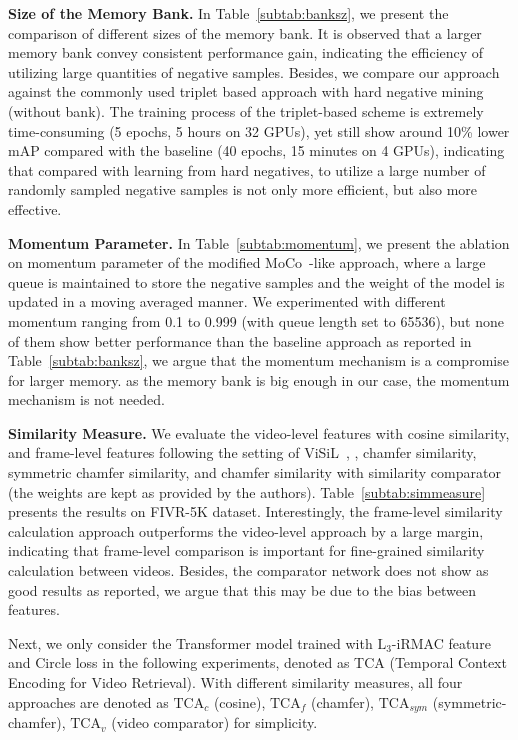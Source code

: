 \documentclass[10pt,twocolumn,letterpaper]{article}
\begin{document}
\textbf{Size of the Memory Bank.}
In Table~\ref{subtab:banksz}, we present the comparison of different sizes of the memory bank. It is observed that a larger memory bank convey consistent performance gain, indicating the efficiency of utilizing large quantities of negative samples.
Besides, we compare our approach against the commonly used triplet based approach with hard negative mining~\cite{kordopatis2017dml} (without bank). The training process of the triplet-based scheme is extremely time-consuming (5 epochs, 5 hours on 32 GPUs), yet still show around 10\% lower mAP compared with the baseline (40 epochs, 15 minutes on 4 GPUs), indicating that compared with learning from hard negatives, to utilize a large number of randomly sampled negative samples is not only more efficient, but also more effective. 

\textbf{Momentum Parameter.}
In Table~\ref{subtab:momentum}, we present the ablation on momentum parameter of the modified MoCo~\cite{he2019momentum}-like approach, where a large queue is maintained to store the negative samples and the weight of the model is updated in a moving averaged manner.
We experimented with different momentum ranging from 0.1 to 0.999 (with queue length set to 65536), but none of them show better performance than the baseline approach as reported in Table~\ref{subtab:banksz}, we argue that the momentum mechanism is a compromise for larger memory. as the memory bank is big enough in our case, the momentum mechanism is not needed. 

\textbf{Similarity Measure.}
We evaluate the video-level features with cosine similarity, and frame-level features following the setting of ViSiL~\cite{kordopatis2019visil}, \ie, chamfer similarity, symmetric chamfer similarity, and chamfer similarity with similarity comparator (the weights are kept as provided by the authors). Table~\ref{subtab:simmeasure} presents the results on FIVR-5K dataset. Interestingly, the frame-level similarity calculation approach outperforms the video-level approach by a large margin, indicating that frame-level comparison is important for fine-grained similarity calculation between videos. Besides, the comparator network does not show as good results as reported, we argue that this may be due to the bias between features.


Next, we only consider the Transformer model trained with $\text{L}_3$-iRMAC feature and Circle loss in the following experiments, denoted as TCA (Temporal Context Encoding for Video Retrieval). With different similarity measures, all four approaches are denoted as $\text{TCA}_{c}$ (cosine), $\text{TCA}_{f}$ (chamfer), $\text{TCA}_{sym}$ (symmetric-chamfer), $\text{TCA}_{v}$ (video comparator) for simplicity.
\end{document}
